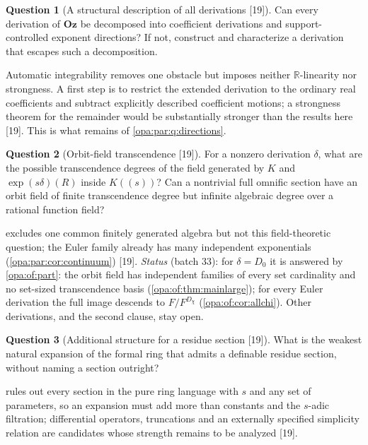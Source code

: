 \documentclass[11pt,oneside]{article}
\numberwithin{equation}{section}
\theoremstyle{definition}
\newtheorem{question}[question]{Question}
\theoremstyle{remark}
\newcommand{\Oz}{\mathbf{Oz}}
\newcommand{\R}{\mathbb R}
\newcommand{\src}[1]{\textup{\textsf{\small[#1]}}}
\begin{document}
\begin{question}[A structural description of all derivations \src{19}]\label{opa:hs:q:structure}
Can every derivation of $\Oz$ be decomposed into coefficient derivations and support-controlled exponent directions? If not, construct and characterize a
derivation that escapes such a decomposition.
\end{question}
Automatic integrability removes one obstacle but imposes neither $\R$-linearity nor strongness. A first step is to restrict the extended derivation to the
ordinary real coefficients and subtract explicitly described coefficient motions; a strongness theorem for the remainder would be substantially stronger
than the results here \src{19}. This is what remains of \cref{opa:par:q:directions}.

\begin{question}[Orbit-field transcendence \src{19}]\label{opa:hs:q:orbitfield}
For a nonzero derivation $\delta$, what are the possible transcendence degrees of the field generated by $K$ and $\exp(s\delta)(R)$ inside $K((s))$? Can a
nontrivial full omnific section have an orbit field of finite transcendence degree but infinite algebraic degree over a rational function field?
\end{question}
 excludes one common finitely generated algebra but not this field-theoretic question; the Euler family already has many
independent exponentials (\cref{opa:par:cor:continuum}) \src{19}. \emph{Status} (batch 33): for $\delta=D_0$ it is answered by \cref{opa:of:part}: the
orbit field has independent families of every set cardinality and no set-sized transcendence basis (\cref{opa:of:thm:mainlarge}); for every Euler
derivation the full image descends to $F/F^{D_\chi}$ (\cref{opa:of:cor:allchi}). Other derivations, and the second clause, stay open.

\begin{question}[Additional structure for a residue section \src{19}]\label{opa:hs:q:expansion}
What is the weakest natural expansion of the formal ring that admits a definable residue section, without naming a section outright?
\end{question}
 rules out every section in the pure ring language with $s$ and any set of parameters, so an expansion must add more than
constants and the $s$-adic filtration; differential operators, truncations and an externally specified simplicity relation are candidates whose
strength remains to be analyzed \src{19}.
\end{document}
